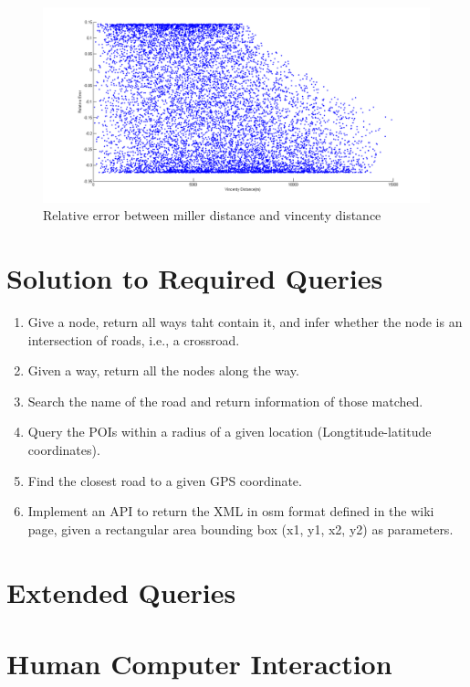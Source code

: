 \documentclass[final,1p,times]{elsarticle}
\begin{document}
\begin{figure}[thpb]
      \centering
      \includegraphics[width=14cm]{Vincenty.png}
      \caption{Relative error between miller distance and vincenty distance}
      \label{fig:Vincenty}
\end{figure}

\section{Solution to Required Queries}
\begin{enumerate}
  \item Give a node, return all ways taht contain it, and infer whether the node is an intersection of roads, i.e., a crossroad.
  \item Given a way, return all the nodes along the way.
  \item Search the name of the road and return information of those matched.
  \item Query the POIs within a radius of a given location (Longtitude-latitude coordinates).
  \item Find the closest road to a given GPS coordinate.
  \item Implement an API to return the XML in osm format defined in the wiki page, given a rectangular area bounding box (x1, y1, x2, y2) as parameters.
\end{enumerate}


\section{Extended Queries}


\section{Human Computer Interaction}
\end{document}
